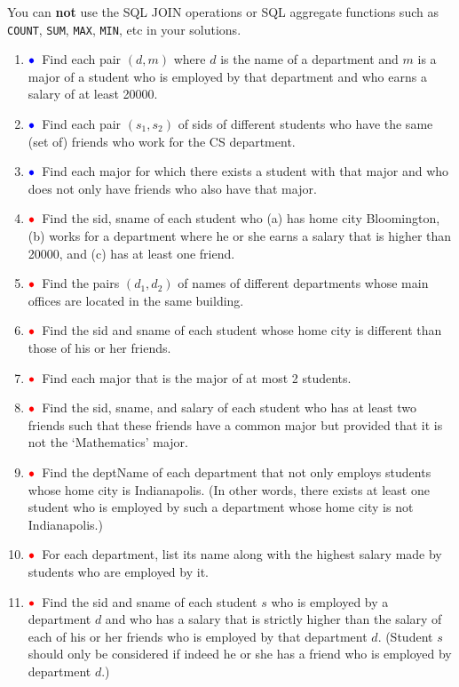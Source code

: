 \documentclass{article}
\newcommand{\red}[1]{{\color{red}#1}}
\newcommand{\blue}[1]{{\color{blue}#1}}
\newcommand{\redbullet}{$\red{\bullet}$}
\newcommand{\bluebullet}{$\blue{\bullet}$}
\begin{document}
You can {\bf not} use the SQL JOIN operations or SQL aggregate functions
such as {\tt COUNT}, {\tt SUM}, {\tt MAX}, {\tt MIN}, etc in your solutions.
\begin{enumerate}[resume]

\item \bluebullet\ Find each pair $(d, m)$ where $d$ is the name of a department and $m$ is a major of 
a student who is employed by that department and who earns a salary of at least 20000.


\item \bluebullet\ Find each pair $(s_1,s_2)$ of sids of different students who have the same (set of) friends who work for the CS department.



\item \bluebullet\ Find each major for which there exists a student with that major and who does not only have friends who also have that major.


\item  \redbullet\ Find the sid, sname of each student who (a) has home city Bloomington, 
(b) works for a department where he or she earns a salary that is higher than 20000, and (c) has at least one friend.
\item  \redbullet\ Find the pairs $(d_1, d_2)$ of names of different departments whose main offices are located in the same building.

\item  \redbullet\ Find the sid and sname of each student whose home city is different than those of his or her friends.
\item  \redbullet\ Find each major that is the major of at most 2 students.
\item  \redbullet\ Find the sid, sname, and salary of each student who has at least two friends such that these friends have a common major but provided that it is not the `Mathematics' major.
\item  \redbullet\ Find the deptName of each department that not only employs students                                                                      
whose home city is Indianapolis. 
(In other words, there exists at least one student who is employed by such a department
whose home city is not Indianapolis.)
\item  \redbullet\ For each department, list its name along with the highest salary made by students who are employed by it.
\item  \redbullet\ Find the sid and sname of each student $s$ who is employed by a department $d$ and who has a salary that is strictly higher than the salary of each of his or her friends who is employed
by that department $d$.  (Student $s$ should only be considered if indeed he or she has a friend who is employed by department $d$.)

\end{enumerate}
\end{document}
